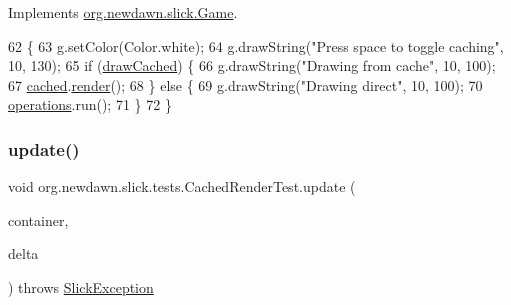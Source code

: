 Implements \mbox{\hyperlink{interfaceorg_1_1newdawn_1_1slick_1_1_game_af1a4670d43eb3ba04dfcf55ab1975b64}{org.\+newdawn.\+slick.\+Game}}.


\begin{DoxyCode}
62                                                                                   \{
63         g.setColor(Color.white);
64         g.drawString(\textcolor{stringliteral}{"Press space to toggle caching"}, 10, 130);
65         \textcolor{keywordflow}{if} (\mbox{\hyperlink{classorg_1_1newdawn_1_1slick_1_1tests_1_1_cached_render_test_ab144e14912cdadf27a4bfcdb5379d49c}{drawCached}}) \{
66             g.drawString(\textcolor{stringliteral}{"Drawing from cache"}, 10, 100);
67             \mbox{\hyperlink{classorg_1_1newdawn_1_1slick_1_1tests_1_1_cached_render_test_a62630e9785f2d264aece45743623722a}{cached}}.\mbox{\hyperlink{classorg_1_1newdawn_1_1slick_1_1_cached_render_a9482132cdcf677dac93768e4161b5dfe}{render}}();
68         \} \textcolor{keywordflow}{else} \{
69             g.drawString(\textcolor{stringliteral}{"Drawing direct"}, 10, 100);
70             \mbox{\hyperlink{classorg_1_1newdawn_1_1slick_1_1tests_1_1_cached_render_test_a2b36bcbc4ab1194e7809b06b2457ca84}{operations}}.run();
71         \}
72     \}
\end{DoxyCode}
\mbox{\label{classorg_1_1newdawn_1_1slick_1_1tests_1_1_cached_render_test_ad267cdebf5cc325fb32c997d876a9eb1}} 
\subsubsection{\texorpdfstring{update()}{update()}}
{\footnotesize\ttfamily void org.\+newdawn.\+slick.\+tests.\+Cached\+Render\+Test.\+update (\begin{DoxyParamCaption}\item[{\mbox{\hyperlink{classorg_1_1newdawn_1_1slick_1_1_game_container}{Game\+Container}}}]{container,  }\item[{int}]{delta }\end{DoxyParamCaption}) throws \mbox{\hyperlink{classorg_1_1newdawn_1_1slick_1_1_slick_exception}{Slick\+Exception}}\hspace{0.3cm}{\ttfamily [inline]}}

